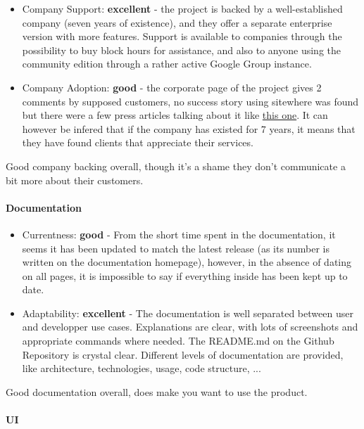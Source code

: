 \documentclass{article}
\begin{document}
\begin{itemize}
\item Company Support: \textbf{excellent} - the project is backed by a well-established company (seven years of existence), and they offer a separate enterprise version with more features. Support is available to companies through the possibility to buy block hours for assistance, and also to anyone using the community edition through a rather active Google Group instance.
\item Company Adoption: \textbf{good} - the corporate page of the project gives 2 comments by supposed customers, no success story using sitewhere was found but there were a few press articles talking about it like \href{https://opensourceforu.com/2017/07/sitewhere-open-platform-connected-devices/?utm_content=buffer4c828&utm_medium=social&utm_source=twitter.com&utm_campaign=buffer}{this one}. It can however be infered that if the company has existed for 7 years, it means that they have found clients that appreciate their services.
\end{itemize}

Good company backing overall, though it's a shame they don't communicate a bit more about their customers.

\paragraph{Documentation}

\begin{itemize}
\item Currentness: \textbf{good} - From the short time spent in the documentation, it seems it has been updated to match the latest release (as its number is written on the documentation homepage), however, in the absence of dating on all pages, it is impossible to say if everything inside has been kept up to date. 
\item Adaptability: \textbf{excellent} - The documentation is well separated between user and developper use cases. Explanations are clear, with lots of screenshots and appropriate commands where needed. The README.md on the Github Repository is crystal clear. Different levels of documentation are provided, like architecture, technologies, usage, code structure, ...
\end{itemize}

Good documentation overall, does make you want to use the product.

\paragraph{UI}
\end{document}
